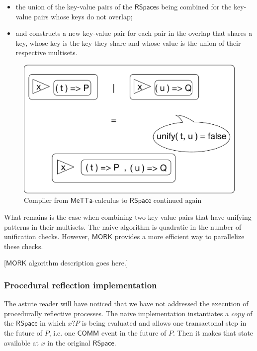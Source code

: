 \begin{itemize}
  \item the union of the key-value pairs of the $\mathsf{RSpace}$s
    being combined for the key-value pairs whose keys do not overlap;
  \item and constructs a new key-value pair for each pair in the
    overlap that shares a key, whose key is the key they share and
    whose value is the union of their respective multisets.
\end{itemize}

\begin{figure}
  \centering
  \includegraphics[scale=0.5]{MeTTaCalcImpl3.pdf}
  \caption{Compiler from $\mathsf{MeTTa}$-calculus to $\mathsf{RSpace}$ continued again}
\end{figure}

What remains is the case when combining two key-value pairs that have
unifying patterns in their multisets. The naive algorithm is quadratic
in the number of unification checks. However, $\mathsf{MORK}$ provides
a more efficient way to parallelize these checks.

[$\mathsf{MORK}$ algorithm description goes here.]

\subsubsection{Procedural reflection implementation}

The astute reader will have noticed that we have not addressed the
execution of procedurally reflective processes. The naive
implementation instantiates a \emph{copy} of the $\mathsf{RSpace}$ in
which $x\mathsf{?}P$ is being evaluated and allows one transactonal
step in the future of $P$, i.e. one $\mathsf{COMM}$ event in the
future of $P$. Then it makes that state available at $x$ in the
original $\mathsf{RSpace}$.

